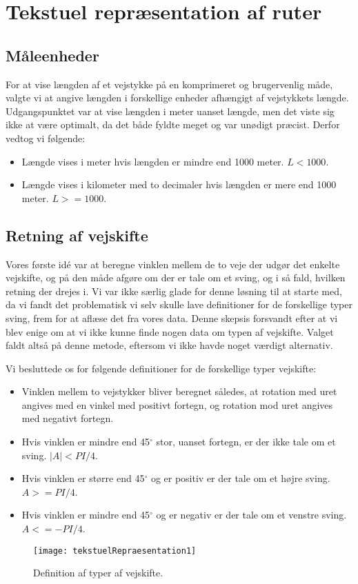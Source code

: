 \section{Tekstuel repræsentation af ruter}
\label{sec:tekstuelRepraesentation}

\subsection{Måleenheder}
\label{sec:maaleenheder}

For at vise længden af et vejstykke på en komprimeret og brugervenlig måde, valgte vi at angive længden i forskellige enheder afhængigt af vejstykkets længde. Udgangspunktet var at vise længden i meter uanset længde, men det viste sig ikke at være optimalt, da det både fyldte meget og var unødigt præcist. Derfor vedtog vi følgende:

\begin{itemize}
	\item Længde vises i meter hvis længden er mindre end 1000 meter. $L < 1000$.
	\item Længde vises i kilometer med to decimaler hvis længden er mere end 1000 meter. $L >= 1000$.
\end{itemize}

\subsection{Retning af vejskifte}
\label{sec:retning}

Vores første idé var at beregne vinklen mellem de to veje der udgør det enkelte vejskifte, og på den måde afgøre om der er tale om et sving, og i så fald, hvilken retning der drejes i. Vi var ikke særlig glade for denne løsning til at starte med, da vi fandt det problematisk vi selv skulle lave definitioner for de forskellige typer sving, frem for at aflæse det fra vores data. Denne skepsis forsvandt efter at vi blev enige om at vi ikke kunne finde nogen data om typen af vejskifte. Valget faldt altså på denne metode, eftersom vi ikke havde noget værdigt alternativ.

Vi besluttede os for følgende definitioner for de forskellige typer vejskifte:

\begin{itemize}
	\item Vinklen mellem to vejstykker bliver beregnet således, at rotation med uret angives med en vinkel med positivt fortegn, og rotation mod uret angives med negativt fortegn.
	\item Hvis vinklen er mindre end 45$^{\circ}$ stor, uanset fortegn, er der ikke tale om et sving. $|A| < PI / 4$.
	\item Hvis vinklen er større end 45$^{\circ}$ og er positiv er der tale om et højre sving. $A >= PI / 4$.
	\item Hvis vinklen er mindre end 45$^{\circ}$ og er negativ er der tale om et venstre sving. $A <= -PI / 4$.
\end{itemize}

\begin{figure}[h]
	\centering
	\texttt{[image: tekstuelRepraesentation1]}
	\captionsetup{width=0.8\textwidth}
	\caption{Definition af typer af vejskifte.}
	\label{figur:tekstuelRepraesentation1}
\end{figure}